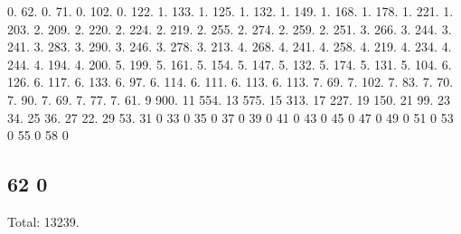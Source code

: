 0. 62. 0. 71. 0. 102. 0. 122. 1. 133. 1. 125. 1. 132. 1. 149. 1. 168. 1. 178. 1. 221. 1. 203. 2. 209. 2. 220. 2. 224. 2. 219. 2. 255. 2. 274. 2. 259. 2. 251. 3. 266. 3. 244. 3. 241. 3. 283. 3. 290. 3. 246. 3. 278. 3. 213. 4. 268. 4. 241. 4. 258. 4. 219. 4. 234. 4. 244. 4. 194. 4. 200. 5. 199. 5. 161. 5. 154. 5. 147. 5. 132. 5. 174. 5. 131. 5. 104. 6. 126. 6. 117. 6. 133. 6. 97. 6. 114. 6. 111. 6. 113. 6. 113. 7. 69. 7. 102. 7. 83. 7. 70. 7. 90. 7. 69. 7. 77. 7. 61. 9 900. 11 554. 13 575. 15 313. 17 227. 19 150. 21 99. 23 34. 25 36. 27 22. 29 53. 31 0 33 0 35 0 37 0 39 0 41 0 43 0 45 0 47 0 49 0 51 0 53 0 55 0 58 0 \subsection*{62 0 }

Total\+: 13239. 